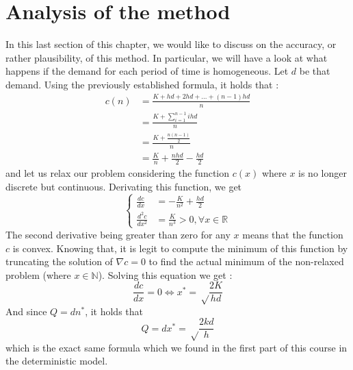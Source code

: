 \section{Analysis of the method}

In this last section of this chapter, we would like to discuss on the accuracy, or rather plausibility, of this method. In particular, we will have a look at what happens if the demand for each period of time is homogeneous. Let $d$ be that demand. Using the previously established formula, it holds that :
\[
    \begin{split}
        c(n) &= \frac{K+hd+2hd+\hdots+(n-1)hd}{n}\\
            &= \frac{K+\sum_{i=1}^{n-1}ihd}{n}\\
            &= \frac{K+\frac{n(n-1)}{2}}{n}\\
            &= \frac{K}{n} + \frac{nhd}{2} - \frac{hd}{2}
    \end{split}
\]
and let us relax our problem considering the function $c(x)$ where $x$ is no longer discrete but continuous. Derivating this function, we get 
\[
    \begin{cases}
        \frac{dc}{dx} &= -\frac{K}{n^2} + \frac{hd}{2}\\
        \frac{d^2c}{dx^2} &= \frac{K}{n^3} > 0, \forall x\in\mathbb R
    \end{cases}
\]
The second derivative being greater than zero for any $x$ means that the function $c$ is convex. Knowing that, it is legit to compute the minimum of this function by truncating the solution of $\nabla c = 0$ to find the actual minimum of the non-relaxed problem (where $x\in\mathbb N$). Solving this equation we get : \[ \frac{dc}{dx} = 0 \Leftrightarrow x^* = \sqrt\frac{2K}{hd} \]
And since $Q = dn^*$, it holds that \[ Q = dx^* = \sqrt\frac{2kd}h  \] which is the exact same formula which we found in the first part of this course in the deterministic model. 
